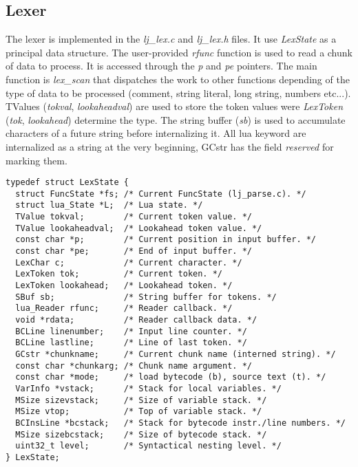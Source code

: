 

\subsection{Lexer}
\label{Subsec:Lexer}

The lexer is implemented in the \emph{lj\_lex.c} and \emph{lj\_lex.h} files.
It use \emph{LexState} as a principal data structure. The user-provided
\emph{rfunc} function is used to read a chunk of data to process. It is accessed
through the \emph{p} and \emph{pe} pointers. The main function is
\emph{lex\_scan} that dispatches the work to other functions depending of the
type of data to be processed (comment, string literal, long string, numbers
etc...). TValues (\emph{tokval}, \emph{lookaheadval}) are used to store the
token values were \emph{LexToken} (\emph{tok}, \emph{lookahead}) determine the
type. The string buffer (\emph{sb}) is used to accumulate characters of a future
string before internalizing it. All lua keyword are internalized as a string at
the very beginning, GCstr has the field \emph{reserved} for marking them.

\begin{lstlisting}[style=CStyle]
typedef struct LexState {
  struct FuncState *fs; /* Current FuncState (lj_parse.c). */
  struct lua_State *L;  /* Lua state. */
  TValue tokval;        /* Current token value. */
  TValue lookaheadval;  /* Lookahead token value. */
  const char *p;        /* Current position in input buffer. */
  const char *pe;       /* End of input buffer. */
  LexChar c;            /* Current character. */
  LexToken tok;         /* Current token. */
  LexToken lookahead;   /* Lookahead token. */
  SBuf sb;              /* String buffer for tokens. */
  lua_Reader rfunc;     /* Reader callback. */
  void *rdata;          /* Reader callback data. */
  BCLine linenumber;    /* Input line counter. */
  BCLine lastline;      /* Line of last token. */
  GCstr *chunkname;     /* Current chunk name (interned string). */
  const char *chunkarg; /* Chunk name argument. */
  const char *mode;     /* load bytecode (b), source text (t). */
  VarInfo *vstack;      /* Stack for local variables. */
  MSize sizevstack;     /* Size of variable stack. */
  MSize vtop;           /* Top of variable stack. */
  BCInsLine *bcstack;   /* Stack for bytecode instr./line numbers. */
  MSize sizebcstack;    /* Size of bytecode stack. */
  uint32_t level;       /* Syntactical nesting level. */
} LexState;
\end{lstlisting}

